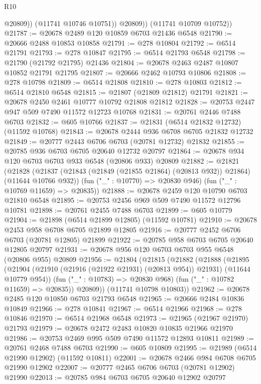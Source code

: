 \begin{lexlean}{R10}
\begin{coremodule}
                @20809))
            (@11741 @10746 @10751))
          @20809))
      (@11741 @10709 @10752))
@21787 := @20678 @2489 @120 @10859 @6703 @21436 @6548
@21790 := @20666 @2488 @10853 @10858
@21791 := @278 @10804
@21792 := @6514 @21791
@21793 := @278 @10847
@21795 := @6514 @21793 @6548
@21798 := @21790 (@21792 @21795) @21436
@21804 := @20678 @2463 @2487 @10807 @10852 @21791 @21795
@21807 := @20666 @2462 @10793 @10806
@21808 := @278 @10798
@21809 := @6514 @21808
@21810 := @278 @10803
@21812 := @6514 @21810 @6548
@21815 := @21807 (@21809 @21812) @21791
@21821 := @20678 @2450 @2461 @10777 @10792 @21808 @21812
@21828 := @20753 @2447 @947 @509 @7490 @11572 @12723 @10768
@21831 := @20761 @2446 @7488 @6703
@21832 := @605 @10766
@21837 := @21831 (@6514 @21832 @12732) (@11592 @10768)
@21843 := @20678 @2444 @936 @6708 @6705 @21832 @12732
@21849 := @20777 @2443 @6706 @6703 (@20781 @12732) @21832
@21855 := @20785 @936 @6703 @6705 @20640 @12732 @20797
@21864 := @20678 @934 @120 @6703 @6703 @933 @6548 (@20806 @933) @20809
@21882 := @21821
    (@21828
      (@21837 (@21843 (@21849 (@21855 @21864) (@20813 @932)) @21864) (@11644 @10766 @932))
      (fun ("_" : @10770) => @20830 @946)
      (fun ("_" : @10769 @11659) => @20835))
@21888 := @20678 @2459 @120 @10790 @6703 @21810 @6548
@21895 := @20753 @2456 @969 @509 @7490 @11572 @12796 @10781
@21898 := @20761 @2455 @7488 @6703
@21899 := @605 @10779
@21904 := @21898 (@6514 @21899 @12805) (@11592 @10781)
@21910 := @20678 @2453 @958 @6708 @6705 @21899 @12805
@21916 := @20777 @2452 @6706 @6703 (@20781 @12805) @21899
@21922 := @20785 @958 @6703 @6705 @20640 @12805 @20797
@21931 := @20678 @956 @120 @6703 @6703 @955 @6548 (@20806 @955) @20809
@21956 := @21804
    (@21815
      (@21882
        (@21888
          (@21895
            (@21904 (@21910 (@21916 (@21922 @21931) (@20813 @954)) @21931) (@11644 @10779 @954))
            (fun ("_" : @10783) => @20830 @968)
            (fun ("_" : @10782 @11659) => @20835))
          @20809))
      (@11741 @10798 @10803))
@21962 := @20678 @2485 @120 @10850 @6703 @21793 @6548
@21965 := @20666 @2484 @10836 @10849
@21966 := @278 @10841
@21967 := @6514 @21966
@21968 := @278 @10846
@21970 := @6514 @21968 @6548
@21973 := @21965 (@21967 @21970) @21793
@21979 := @20678 @2472 @2483 @10820 @10835 @21966 @21970
@21986 := @20753 @2469 @995 @509 @7490 @11572 @12893 @10811
@21989 := @20761 @2468 @7488 @6703
@21990 := @605 @10809
@21995 := @21989 (@6514 @21990 @12902) (@11592 @10811)
@22001 := @20678 @2466 @984 @6708 @6705 @21990 @12902
@22007 := @20777 @2465 @6706 @6703 (@20781 @12902) @21990
@22013 := @20785 @984 @6703 @6705 @20640 @12902 @20797

\end{coremodule}
\end{lexlean}
